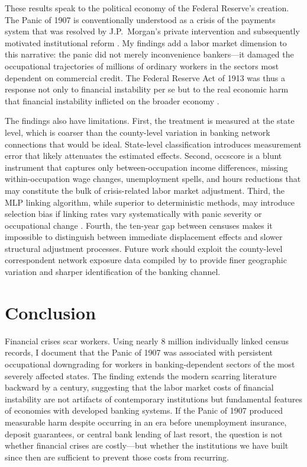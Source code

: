 \documentclass[12pt]{article}
\begin{document}
These results speak to the political economy of the Federal Reserve's creation. The Panic of 1907 is conventionally understood as a crisis of the payments system that was resolved by J.P.\ Morgan's private intervention and subsequently motivated institutional reform \citep{friedman1963monetary, gorton1988banking}. My findings add a labor market dimension to this narrative: the panic did not merely inconvenience bankers---it damaged the occupational trajectories of millions of ordinary workers in the sectors most dependent on commercial credit. The Federal Reserve Act of 1913 was thus a response not only to financial instability per se but to the real economic harm that financial instability inflicted on the broader economy \citep{bordo2000no, schularick2012credit}.

The findings also have limitations. First, the treatment is measured at the state level, which is coarser than the county-level variation in banking network connections that would be ideal. State-level classification introduces measurement error that likely attenuates the estimated effects. Second, occscore is a blunt instrument that captures only between-occupation income differences, missing within-occupation wage changes, unemployment spells, and hours reductions that may constitute the bulk of crisis-related labor market adjustment. Third, the MLP linking algorithm, while superior to deterministic methods, may introduce selection bias if linking rates vary systematically with panic severity or occupational change \citep{abramitzky2021automated}. Fourth, the ten-year gap between censuses makes it impossible to distinguish between immediate displacement effects and slower structural adjustment processes. Future work should exploit the county-level correspondent network exposure data compiled by \citet{frydman2023panic} to provide finer geographic variation and sharper identification of the banking channel.


\section{Conclusion}

Financial crises scar workers. Using nearly 8 million individually linked census records, I document that the Panic of 1907 was associated with persistent occupational downgrading for workers in banking-dependent sectors of the most severely affected states. The finding extends the modern scarring literature backward by a century, suggesting that the labor market costs of financial instability are not artifacts of contemporary institutions but fundamental features of economies with developed banking systems. If the Panic of 1907 produced measurable harm despite occurring in an era before unemployment insurance, deposit guarantees, or central bank lending of last resort, the question is not whether financial crises are costly---but whether the institutions we have built since then are sufficient to prevent those costs from recurring.
\end{document}
